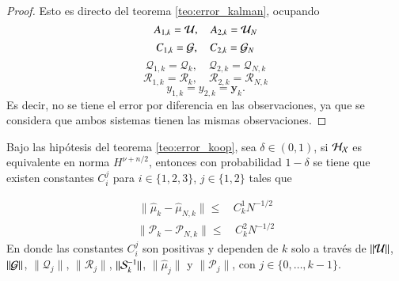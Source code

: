 \begin{proof}
    Esto es directo del teorema \ref{teo:error_kalman}, ocupando
    \begin{equation*}
        A_{1,k} = \U, \quad A_{2,k} = \U_N 
    \end{equation*}
    \begin{equation*}
        C_{1,k} = \G, \quad C_{2,k} = \G_N 
    \end{equation*}
    \begin{equation*}
        \mathcal{Q}_{1,k} = \mathcal{Q}_k, \quad \mathcal{Q}_{2,k} = \mathcal{Q}_{N, k}
    \end{equation*}
    \begin{equation*}
        \mathcal{R}_{1,k} = \mathcal{R}_k, \quad \mathcal{R}_{2,k} = \mathcal{R}_{N, k}
    \end{equation*}
    \begin{equation*}
        y_{1, k} = y_{2, k} = \mathbf{y}_k.
    \end{equation*}
    Es decir, no se tiene el error por diferencia en las observaciones, ya que se considera que ambos sistemas tienen las mismas observaciones.
\end{proof}

\begin{teo}
    Bajo las hipótesis del teorema \ref{teo:error_koop}, sea $\delta \in (0, 1)$, si $\H_\X$ es equivalente en norma $H^{\nu + n/2}$, entonces con probabilidad $1-\delta$ se tiene que existen constantes $C_i^j$ para $i \in \{1, 2, 3\}$, $j \in \{1, 2\}$ tales que
	
	\begin{equation*}
		\begin{aligned}
			\| \hat \mu_{k} - \hat \mu_{N,k}  \| \leq & \, C_{k}^1 N^{-1/2}
		\end{aligned}
	\end{equation*}
	\begin{equation*}
		\begin{aligned}
			\| \mathcal{P}_{k} - \mathcal{P}_{N,k}  \| \leq & \, C_{k}^2 N^{-1/2} 
		\end{aligned}
	\end{equation*}
	En donde las constantes $C_i^j$ son positivas y dependen de $k$ solo a través de $\| \U \| $, $\| \G \| $, $\| \mathcal{Q}_{j} \| $, $\| \mathcal{R}_{j} \| $, $\| \S_{k}^{-1} \| $, $\| \hat{\mu}_{j} \| $ y $\| \mathcal{P}_{j} \| $, con $j \in \{ 0, \dots, k-1\}$.
    \label{teo:teo_kkkf_2}
\end{teo}

